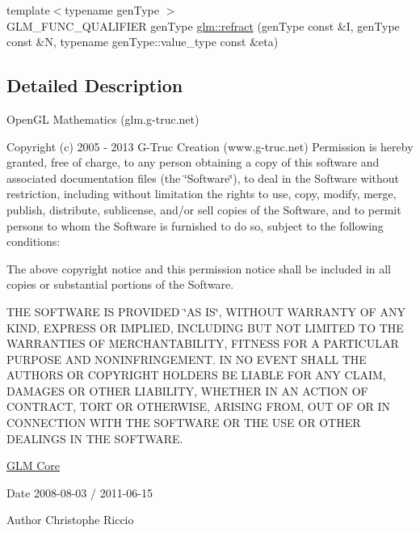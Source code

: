 \begin{DoxyCompactItemize}
\item 
{\footnotesize template$<$typename gen\+Type $>$ }\\G\+L\+M\+\_\+\+F\+U\+N\+C\+\_\+\+Q\+U\+A\+L\+I\+F\+I\+E\+R gen\+Type \hyperlink{group__core__func__geometric_ga36fed34a95462694bab6d58cb32f6dc4}{glm\+::refract} (gen\+Type const \&I, gen\+Type const \&N, typename gen\+Type\+::value\+\_\+type const \&eta)
\end{DoxyCompactItemize}


\subsection{Detailed Description}
Open\+G\+L Mathematics (glm.\+g-\/truc.\+net)

Copyright (c) 2005 -\/ 2013 G-\/\+Truc Creation (www.\+g-\/truc.\+net) Permission is hereby granted, free of charge, to any person obtaining a copy of this software and associated documentation files (the \char`\"{}\+Software\char`\"{}), to deal in the Software without restriction, including without limitation the rights to use, copy, modify, merge, publish, distribute, sublicense, and/or sell copies of the Software, and to permit persons to whom the Software is furnished to do so, subject to the following conditions\+:

The above copyright notice and this permission notice shall be included in all copies or substantial portions of the Software.

T\+H\+E S\+O\+F\+T\+W\+A\+R\+E I\+S P\+R\+O\+V\+I\+D\+E\+D \char`\"{}\+A\+S I\+S\char`\"{}, W\+I\+T\+H\+O\+U\+T W\+A\+R\+R\+A\+N\+T\+Y O\+F A\+N\+Y K\+I\+N\+D, E\+X\+P\+R\+E\+S\+S O\+R I\+M\+P\+L\+I\+E\+D, I\+N\+C\+L\+U\+D\+I\+N\+G B\+U\+T N\+O\+T L\+I\+M\+I\+T\+E\+D T\+O T\+H\+E W\+A\+R\+R\+A\+N\+T\+I\+E\+S O\+F M\+E\+R\+C\+H\+A\+N\+T\+A\+B\+I\+L\+I\+T\+Y, F\+I\+T\+N\+E\+S\+S F\+O\+R A P\+A\+R\+T\+I\+C\+U\+L\+A\+R P\+U\+R\+P\+O\+S\+E A\+N\+D N\+O\+N\+I\+N\+F\+R\+I\+N\+G\+E\+M\+E\+N\+T. I\+N N\+O E\+V\+E\+N\+T S\+H\+A\+L\+L T\+H\+E A\+U\+T\+H\+O\+R\+S O\+R C\+O\+P\+Y\+R\+I\+G\+H\+T H\+O\+L\+D\+E\+R\+S B\+E L\+I\+A\+B\+L\+E F\+O\+R A\+N\+Y C\+L\+A\+I\+M, D\+A\+M\+A\+G\+E\+S O\+R O\+T\+H\+E\+R L\+I\+A\+B\+I\+L\+I\+T\+Y, W\+H\+E\+T\+H\+E\+R I\+N A\+N A\+C\+T\+I\+O\+N O\+F C\+O\+N\+T\+R\+A\+C\+T, T\+O\+R\+T O\+R O\+T\+H\+E\+R\+W\+I\+S\+E, A\+R\+I\+S\+I\+N\+G F\+R\+O\+M, O\+U\+T O\+F O\+R I\+N C\+O\+N\+N\+E\+C\+T\+I\+O\+N W\+I\+T\+H T\+H\+E S\+O\+F\+T\+W\+A\+R\+E O\+R T\+H\+E U\+S\+E O\+R O\+T\+H\+E\+R D\+E\+A\+L\+I\+N\+G\+S I\+N T\+H\+E S\+O\+F\+T\+W\+A\+R\+E.

\hyperlink{group__core}{G\+L\+M Core}

\begin{DoxyDate}{Date}
2008-\/08-\/03 / 2011-\/06-\/15 
\end{DoxyDate}
\begin{DoxyAuthor}{Author}
Christophe Riccio 
\end{DoxyAuthor}
